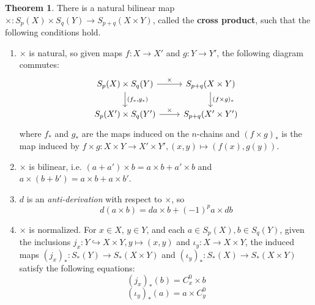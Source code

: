 \documentclass[11pt, oneside]{amsart}   	%
\theoremstyle{definition}
\newtheorem{theorem}{Theorem}[section]
\begin{document}
\begin{theorem}
	There is a natural bilinear map $\times : S_p(X)\times S_q(Y)\rightarrow S_{p + q}(X \times Y)$, called the \textbf{cross 
	product}, such that the following conditions hold.
	\begin{enumerate}
		\item $\times$ is natural, so given maps $f : X\rightarrow X'$ and $g : Y\rightarrow Y'$, the following diagram 
		commutes:
		\begin{equation}\begin{tikzcd}
			S_p(X)\times S_q(Y) \arrow[r, "\times"]\arrow[d, "{(f_*, g_*)}"] & S_{p + q}(X \times Y)
			\arrow[d, "(f \times g)_*"] \\
			S_p(X')\times S_q(Y')\arrow[r, "\times"] & S_{p + q}(X'\times Y')
		\end{tikzcd}\end{equation}
		where $f_*$ and $g_*$ are the maps induced on the $n$-chains and $(f\times g)_*$ is the map induced by 
		$f\times g : X\times Y\rightarrow X'\times Y', (x, y)\mapsto (f(x), g(y))$. 
		\item $\times$ is bilinear, i.e. $(a + a')\times b = a\times b + a'\times b$ and $a\times (b + b') = a\times b + a\times 
		b'$. 
		\item $d$ is an \textit{anti-derivation} with respect to $\times$, so
		\begin{equation}
			d(a\times b) = da\times b + (-1)^p a\times db
		\end{equation}
		\item $\times$ is normalized. For $x\in X$, $y\in Y$, and each $a\in S_p(X), b\in S_q(Y)$, given the inclusions 
		$j_x : Y\hookrightarrow X\times Y, y\mapsto (x, y)$ and $\iota_y : X\rightarrow X\times Y$, the induced maps 
		$(j_x)_* : S_*(Y)\rightarrow S_*(X\times Y)$ and $(\iota_y)_* : S_*(X)\rightarrow S_*(X\times Y)$ satisfy the 
		following equations:
		\begin{equation}
			(j_x)_*(b) = C_x^0\times b
		\end{equation}
		\begin{equation}
			(\iota_y)_* (a) = a\times C_y^0
		\end{equation}
	\end{enumerate}
\label{thm:cross_product}
\end{theorem}
\end{document}
